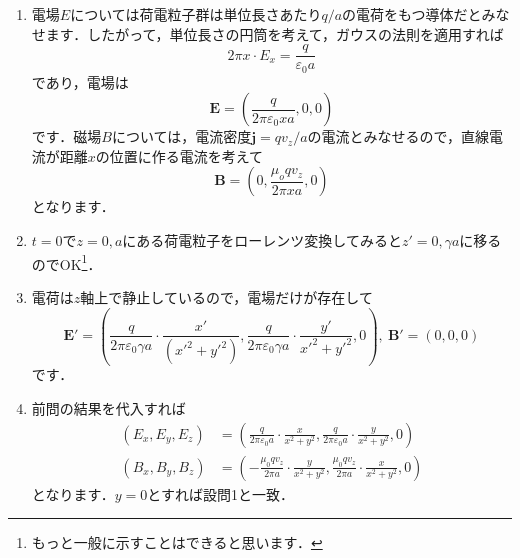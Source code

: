 \documentclass[a4paper,pdflatex,ja=standard]{bxjsarticle}
\begin{document}
\begin{enumerate}

  \item 
  
  電場$E$については荷電粒子群は単位長さあたり$q/a$の電荷をもつ導体だとみなせます．したがって，単位長さの円筒を考えて，ガウスの法則を適用すれば
  \begin{equation}
    2\pi x\cdot E_x
    =
    \frac{q}{\varepsilon_0 a}
  \end{equation}
  であり，電場は
  \begin{equation}
    \bm{E}
    =
    \left(  
      \frac{q}{2\pi\varepsilon_0 xa}
      ,
      0
      ,
      0
    \right)
  \end{equation}
  です．磁場$B$については，電流密度$\bm{j}=qv_z/a$の電流とみなせるので，直線電流が距離$x$の位置に作る電流を考えて
  \begin{equation}
    \bm{B}
    =
    \left(  
      0
      ,
      \frac{\mu_o qv_z}{2\pi xa}
      ,
      0
    \right)
  \end{equation}
  となります．


  \item 

  $t=0$で$z=0,a$にある荷電粒子をローレンツ変換してみると$z'=0,\gamma a$に移るのでOK\footnote{
    もっと一般に示すことはできると思います．
  }．

  
  \item 

  電荷は$z$軸上で静止しているので，電場だけが存在して
  \begin{equation}
    \bm{E}'
    =
    \left(  
      \frac{q}{2\pi\varepsilon_0 \gamma a}
      \cdot
      \frac{x'}{({x'}^2+{y'}^2)}
      ,
      \frac{q}{2\pi\varepsilon_0 \gamma a}
      \cdot
      \frac{y'}{{x'}^2+{y'}^2}
      ,
      0
    \right)
    ,\ 
    \bm{B}'
    =
    \left(  
      0
      ,
      0
      ,
      0
    \right)
  \end{equation}
  です．


  \item 

  前問の結果を代入すれば
  \begin{align}
    (E_x,E_y,E_z)
    &=
    \left(  
      \frac{q}{2\pi\varepsilon_0 a}
      \cdot
      \frac{x}{x^2+y^2}
      ,
      \frac{q}{2\pi\varepsilon_0 a}
      \cdot
      \frac{y}{x^2+y^2}
      ,
      0
    \right)
    \nonumber
    \\
    (B_x,B_y,B_z)
    &=
    \left(  
      -
      \frac{\mu_0qv_z}{2\pi a}
      \cdot
      \frac{y}{x^2+y^2}
      ,
      \frac{\mu_0qv_z}{2\pi a}
      \cdot
      \frac{x}{x^2+y^2}
      ,
      0
    \right)
  \end{align}
  となります．$y=0$とすれば設問1と一致．



\end{enumerate}
\end{document}
